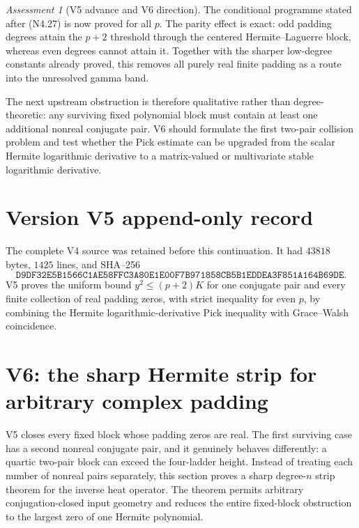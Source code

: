 \documentclass[11pt]{article}
\theoremstyle{definition}
\theoremstyle{remark}
\newtheorem{assessment}[theorem]{Assessment}
\begin{document}
\begin{assessment}[V5 advance and V6 direction]
The conditional programme stated after \textup{(N4.27)} is now proved for
all \(p\).  The parity effect is exact: odd padding degrees attain the
\(p+2\) threshold through the centered Hermite--Laguerre block, whereas even
degrees cannot attain it.  Together with the sharper low-degree constants
already proved, this removes all purely real finite padding as a route into
the unresolved gamma band.

The next upstream obstruction is therefore qualitative rather than
degree-theoretic: any surviving fixed polynomial block must contain at least
one additional nonreal conjugate pair.  V6 should formulate the first
two-pair collision problem and test whether the Pick estimate can be upgraded
from the scalar Hermite logarithmic derivative to a matrix-valued or
multivariate stable logarithmic derivative.
\end{assessment}

\section*{Version V5 append-only record}
The complete V4 source was retained before this continuation.  It had
\(43818\) bytes, \(1425\) lines, and SHA--256
\[
 \texttt{D9DF32E5B1566C1AE58FFC3A80E1E00F7B971858CB5B1EDDEA3F851A164B69DE}.
\]
V5 proves the uniform bound \(y^2\le(p+2)K\) for one conjugate pair and
every finite collection of real padding zeros, with strict inequality for
even \(p\), by combining the Hermite logarithmic-derivative Pick inequality
with Grace--Walsh coincidence.




\section{V6: the sharp Hermite strip for arbitrary complex padding}
\label{sec:grh-v6}

V5 closes every fixed block whose padding zeros are real.  The first
surviving case has a second nonreal conjugate pair, and it genuinely behaves
differently: a quartic two-pair block can exceed the four-ladder height.
Instead of treating each number of nonreal pairs separately, this section
proves a sharp degree-\(n\) strip theorem for the inverse heat operator.
The theorem permits arbitrary conjugation-closed input geometry and reduces
the entire fixed-block obstruction to the largest zero of one Hermite
polynomial.
\end{document}

